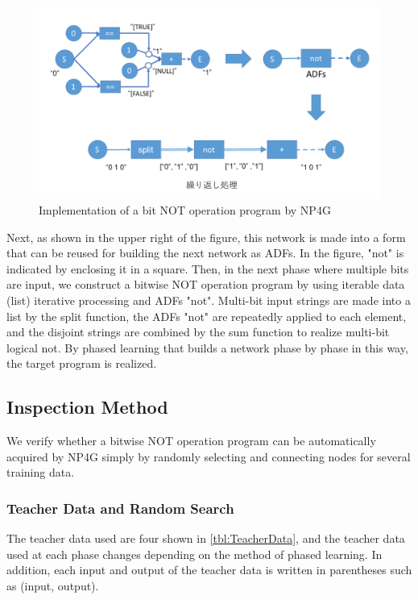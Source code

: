 \documentclass{article}
\begin{document}
\begin{figure}[t]
    \begin{center}
        \includegraphics[width=150mm]{bitwise_not.png}
    \end{center}
    \caption{Implementation of a bit NOT operation program by NP4G}
    \label{fig:bitwise_not}
\end{figure}

Next, as shown in the upper right of the figure, this network is made into a form that can be reused for building the next network as ADFs.
In the figure, "not" is indicated by enclosing it in a square.
Then, in the next phase where multiple bits are input, we construct a bitwise NOT operation program by using iterable data (list) iterative processing and ADFs "not".
Multi-bit input strings are made into a list by the split function, the ADFs "not" are repeatedly applied to each element, and the disjoint strings are combined by the sum function to realize multi-bit logical not.
By phased learning that builds a network phase by phase in this way, the target program is realized.

\subsection {Inspection Method}
We verify whether a bitwise NOT operation program can be automatically acquired by NP4G simply by randomly selecting and connecting nodes for several training data.

\subsubsection {Teacher Data and Random Search}
The teacher data used are four shown in \ref{tbl:TeacherData}, and the teacher data used at each phase changes depending on the method of phased learning.
In addition, each input and output of the teacher data is written in parentheses such as (input, output).
\end{document}
